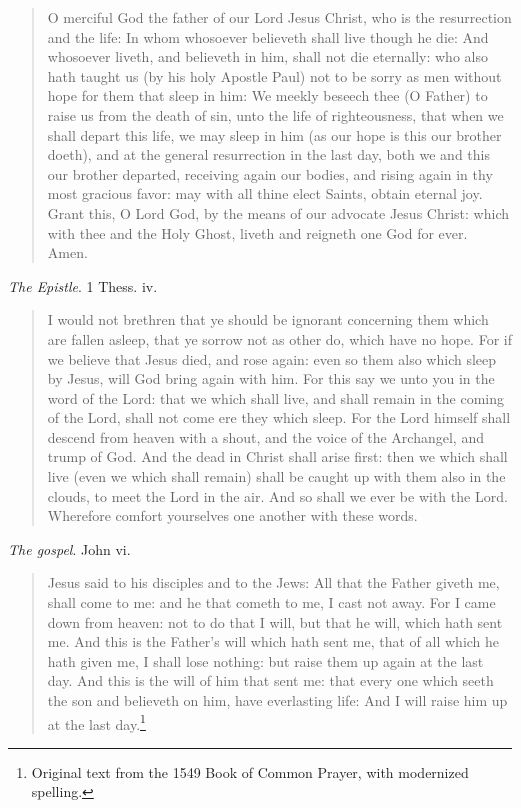\documentclass[
]{book}
\begin{document}
\begin{quote}
O merciful God the father of our Lord Jesus Christ, who is the resurrection and the life: In whom whosoever believeth shall live though he die: And whosoever liveth, and believeth in him, shall not die eternally: who also hath taught us (by his holy Apostle Paul) not to be sorry as men without hope for them that sleep in him: We meekly beseech thee (O Father) to raise us from the death of sin, unto the life of righteousness, that when we shall depart this life, we may sleep in him (as our hope is this our brother doeth), and at the general resurrection in the last day, both we and this our brother departed, receiving again our bodies, and rising again in thy most gracious favor: may with all thine elect Saints, obtain eternal joy. Grant this, O Lord God, by the means of our advocate Jesus Christ: which with thee and the Holy Ghost, liveth and reigneth one God for ever. Amen.
\end{quote}

\emph{The Epistle}. 1 Thess. iv.

\begin{quote}
I would not brethren that ye should be ignorant concerning them which are fallen asleep, that ye sorrow not as other do, which have no hope. For if we believe that Jesus died, and rose again: even so them also which sleep by Jesus, will God bring again with him. For this say we unto you in the word of the Lord: that we which shall live, and shall remain in the coming of the Lord, shall not come ere they which sleep. For the Lord himself shall descend from heaven with a shout, and the voice of the Archangel, and trump of God. And the dead in Christ shall arise first: then we which shall live (even we which shall remain) shall be caught up with them also in the clouds, to meet the Lord in the air. And so shall we ever be with the Lord. Wherefore comfort yourselves one another with these words.
\end{quote}

\emph{The gospel}. John vi.

\begin{quote}
Jesus said to his disciples and to the Jews: All that the Father giveth me, shall come to me: and he that cometh to me, I cast not away. For I came down from heaven: not to do that I will, but that he will, which hath sent me. And this is the Father's will which hath sent me, that of all which he hath given me, I shall lose nothing: but raise them up again at the last day. And this is the will of him that sent me: that every one which seeth the son and believeth on him, have everlasting life: And I will raise him up at the last day.\footnote{Original text from the 1549 Book of Common Prayer, with modernized spelling.}
\end{quote}
\end{document}
